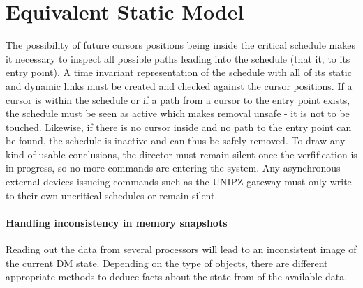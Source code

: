 \newpage
\section{Equivalent Static Model}
\label{sec:esm}
The possibility of future cursors positions being inside the critical schedule makes it necessary to inspect all possible paths leading into the schedule (that it, to its entry point).
A time invariant representation of the schedule with all of its static and dynamic links must be created and checked against the cursor positions.
If a cursor is within the schedule or if a path from a cursor to the entry point exists, the schedule must be seen as active which makes removal unsafe - it is not to be touched.
Likewise, if there is no cursor inside and no path to the entry point can be found, the schedule is inactive and can thus be safely removed. To draw any kind of usable conclusions, the director must remain silent
once the verfification is in progress, so no more commands are entering the system. Any asynchronous external devices issueing commands such as the UNIPZ gateway must only write to their own uncritical schedules or remain silent.

\paragraph{Handling inconsistency in memory snapshots}
Reading out the data from several processors will lead to an inconsistent image of the current DM state. Depending on the type of objects, there are different appropriate methods to deduce facts about the state from of the available data.


